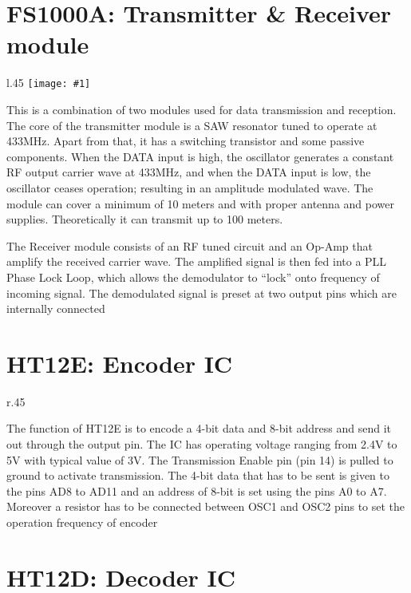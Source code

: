 \documentclass[12pt, a4paper]{report}
\newcommand{\addsvg}[2]{}
\newcommand{\addimg}[2]{\texttt{[image: \#1]}}
\newcommand{\floatfig}[6]{
  \begin{wrapfigure}{#1}{#2\textwidth}
    \centering
    \addimg{images/#3}{#4\linewidth}
    \caption{\centering #5}
    \vspace*{#6}
  \end{wrapfigure}
}
\newcommand{\floatfigsvg}[6]{
  \begin{wrapfigure}{#1}{#2\textwidth}
    \centering
    \addsvg{images/#3}{#4\linewidth}
    \caption{\centering #5}
    \vspace*{#6}
  \end{wrapfigure}
}
\begin{document}
\section{FS1000A: Transmitter \& Receiver module}

\floatfig{l}{.45}{fs100a.png}{.9}
{FS1000A receiver \&\\ transmitter pair}{.2cm}

This is a combination of two modules used for data transmission and
reception. The  core of the transmitter module is a SAW resonator
tuned to operate at 433MHz. Apart from that, it has a switching
transistor and some passive components. When the DATA input is high,
the oscillator generates a constant RF output carrier wave at 433MHz,
and when the DATA input is low, the oscillator ceases operation;
resulting in an amplitude modulated wave. The module can cover a
minimum of 10 meters and with proper antenna and power supplies.
Theoretically it can transmit up to 100 meters.

The Receiver module consists of an RF tuned circuit and an Op-Amp
that amplify the received carrier wave. The amplified signal is then
fed into a PLL Phase Lock Loop, which allows the demodulator to
“lock” onto frequency of incoming signal. The demodulated signal is
preset at two output pins which are internally connected
\newpage

\section{HT12E: Encoder IC}

\floatfigsvg{r}{.45}{ht12e.svg}{.8}{HT12E encoder IC pinout}{-1cm}

The function of HT12E is to encode a 4-bit data and 8-bit address and
send it out through the output pin. The IC has operating voltage
ranging from 2.4V to 5V with typical value of 3V. The Transmission
Enable pin (pin 14) is pulled to ground to activate transmission. The
4-bit data that has to be sent is given to the pins AD8 to AD11 and
an address of 8-bit is set using the pins A0 to A7.  Moreover a
resistor has to be connected between OSC1 and OSC2 pins to set the
operation frequency of encoder

\vspace*{1.5cm}

\section{HT12D: Decoder IC}
\end{document}
